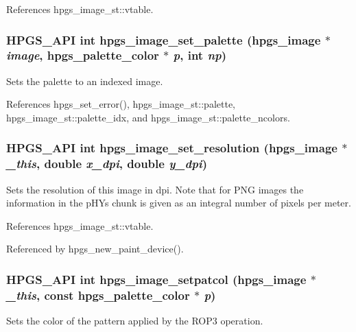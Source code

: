 References hpgs\_\-image\_\-st::vtable.

\subsubsection[{hpgs\_\-image\_\-set\_\-palette}]{\setlength{\rightskip}{0pt plus 5cm}HPGS\_\-API int hpgs\_\-image\_\-set\_\-palette ({\bf hpgs\_\-image} $\ast$ {\em image}, \/  {\bf hpgs\_\-palette\_\-color} $\ast$ {\em p}, \/  int {\em np})}\label{group__image_gaccce2a8027854c1898034302d33b1471}
Sets the palette to an indexed image. 

References hpgs\_\-set\_\-error(), hpgs\_\-image\_\-st::palette, hpgs\_\-image\_\-st::palette\_\-idx, and hpgs\_\-image\_\-st::palette\_\-ncolors.

\subsubsection[{hpgs\_\-image\_\-set\_\-resolution}]{\setlength{\rightskip}{0pt plus 5cm}HPGS\_\-API int hpgs\_\-image\_\-set\_\-resolution ({\bf hpgs\_\-image} $\ast$ {\em \_\-this}, \/  double {\em x\_\-dpi}, \/  double {\em y\_\-dpi})}\label{group__image_ga70f2f4f5bdec053d29e89991d97db67a}
Sets the resolution of this image in dpi. Note that for PNG images the information in the pHYs chunk is given as an integral number of pixels per meter. 

References hpgs\_\-image\_\-st::vtable.



Referenced by hpgs\_\-new\_\-paint\_\-device().

\subsubsection[{hpgs\_\-image\_\-setpatcol}]{\setlength{\rightskip}{0pt plus 5cm}HPGS\_\-API int hpgs\_\-image\_\-setpatcol ({\bf hpgs\_\-image} $\ast$ {\em \_\-this}, \/  const {\bf hpgs\_\-palette\_\-color} $\ast$ {\em p})}\label{group__image_ga3d1709fd4b96a366af437eea44ddf0bd}
Sets the color of the pattern applied by the ROP3 operation. 

